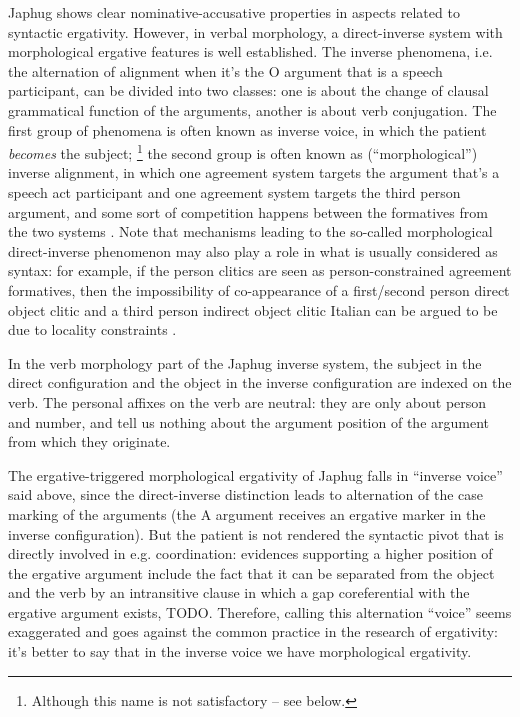 \documentclass[a4paper, oneside, 12pt]{report}
\newcommand*{\citepage}[1]{p.~{#1}}
\begin{document}
Japhug shows clear nominative-accusative properties 
in aspects related to syntactic ergativity.
However, in verbal morphology, 
a direct-inverse system with 
morphological ergative features is well established.
The inverse phenomena, i.e. 
the alternation of alignment when it's the O argument that is a speech participant, 
can be divided into two classes: 
one is about the change of clausal grammatical function of the arguments, 
another is about verb conjugation.
The first group of phenomena is often known as inverse voice, 
in which the patient \emph{becomes} the subject;%
\footnote{
    Although this name is not satisfactory -- see below.
}
the second group is often known as (``morphological'') inverse alignment, 
in which one agreement system targets the argument that's a speech act participant 
and one agreement system targets the third person argument,
and some sort of competition happens between the formatives from the two systems
\citep{oxford2023tale}.
Note that mechanisms leading to the so-called morphological direct-inverse phenomenon
may also play a role in what is usually considered as syntax:
for example, if the person clitics are seen as person-constrained agreement formatives,
then the impossibility of co-appearance of a first/second person direct object clitic and a third person indirect object clitic Italian 
can be argued to be due to locality constraints 
\citep{bianchi2006syntax}.

In the verb morphology part of the Japhug inverse system, 
the subject in the direct configuration
and the object in the inverse configuration 
are indexed on the verb. 
The personal affixes on the verb are neutral: 
they are only about person and number, 
and tell us nothing about the argument position of the argument 
from which they originate.

The ergative-triggered morphological ergativity of Japhug
falls in ``inverse voice'' said above, 
since the direct-inverse distinction leads to 
alternation of the case marking of the arguments 
(the A argument receives an ergative marker in the inverse configuration).
But the patient is not rendered the syntactic pivot 
that is directly involved in e.g. coordination:
evidences supporting a higher position of the ergative argument 
include the fact that it can be separated from the object and the verb 
by an intransitive clause \citep[\citepage{306}]{jacques2021grammar}
in which a gap coreferential with the ergative argument exists, TODO.
Therefore, calling this alternation ``voice'' seems exaggerated 
and goes against the common practice in the research of ergativity:
it's better to say that in the inverse voice we have morphological ergativity.
\end{document}
